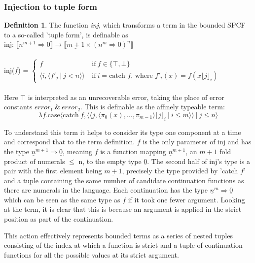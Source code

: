 \documentclass[12pt,a4paper]{report}
\theoremstyle{definition}
\newtheorem{definition}{Definition}[chapter]%
\theoremstyle{remark}
\begin{document}
\subsubsection{Injection to tuple form}
\begin{definition}
    The function \emph{inj}, which transforms a term in the bounded SPCF to a so-called 'tuple form', is definable as \\
    inj: $\llbracket \underline{n}^{m+1} \Rightarrow \underline{0} \rrbracket \rightarrow \llbracket \underline{m + 1} \times (\underline{n}^{m} \Rightarrow \underline{0})^n \rrbracket$\\\\
    inj($f$) =
    $\begin{cases}
        f &\text{if}\ f \in \{\top, \bot\}\\
        \langle i, \langle f'_j\ |\ j < n \rangle \rangle\ &\text{if}\ i = \text{catch } f  \text{, where } f'_i(x) =  f(x \lfloor j \rfloor_i)
    \end{cases}$\\\\
    Here $\top$ is interpreted as an unrecoverable error, taking the place of error constants $error_1\ \&\ error_2$. 
    This is definable as the affinely typeable term:
    \[
    \lambda f.\text{case}\langle \text{catch}\ f, \langle \langle j, \langle \pi_0(x),\dots,\pi_{m-1}\rangle \lfloor j \rfloor_i\ |\ i \leq m \rangle \rangle\ |\ j \le n \rangle
    \]
\end{definition}

To understand this term it helps to consider its type one component at a time and correspond that to the term definition. $f$ is the only parameter of inj and has the type $\underline{n}^{m+1} \Rightarrow \underline{0}$, meaning $f$ is a function mapping $\underline{n}^{m+1}$, an $m+1$ fold product of numerals $\le$ n, to the empty type $\underline{0}$.  The second half of inj's type is a pair with the first element being $\underline{m+1}$, precisely the type provided by 'catch $f$' and a tuple containing the same number of candidate continuation functions as there are numerals in the language. Each continuation has the type $\underline{n}^{m} \Rightarrow \underline{0}$ which can be seen as the same type as $f$ if it took one fewer argument. Looking at the term, it is clear that this is because an argument is applied in the strict position as part of the continuation. 

This action effectively represents bounded terms as a series of nested tuples consisting of the index at which a function is strict and a tuple of continuation functions for all the possible values at its strict argument. 
\end{document}
